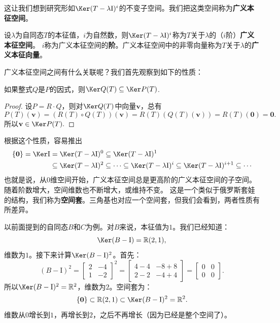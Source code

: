 \documentclass[12pt,UTF8]{ctexbook}
\begin{document}
这让我们想到研究形如$\Ker (T - \lambda\mathrm{I})^i$的不变子空间。我们把这类空间称为\textbf{广义本征空间}。

\begin{df}\label{df:6_4}
    设$\lambda$为自同态$T$的本征值，$i$为自然数，则$\Ker (T - \lambda\mathrm{I})^i$称为$T$关于$\lambda$的（$i$阶）\textbf{广义本征空间}。
    $i$称为广义本征空间的\textbf{阶}。广义本征空间中的非零向量称为$T$关于$\lambda$的\textbf{广义本征向量}。
\end{df}

广义本征空间之间有什么关联呢？我们首先观察到如下的性质：
\begin{pp}\label{pp:6_12_1}
    如果整式$Q$是$P$的因式，则$\Ker Q(T) \subseteq \Ker P(T)$.
\end{pp}
\begin{proof} %
    设$P = R \cdot Q$，则对$\Ker Q(T)$中向量$\mathbf{v}$，总有
    $$P(T)(\mathbf{v}) = (R(T)\circ Q(T))(\mathbf{v}) = R(T)(Q(T)(\mathbf{v})) = R(T)(\mathbf{0}) = \mathbf{0}. $$
    所以$\mathbf{v} \in \Ker P(T).$

\end{proof}

根据这个性质，容易推出
\begin{align*}
    \{\mathbf{0}\} = \Ker \mathrm{I} &= \Ker (T - \lambda\mathrm{I})^0 \subseteq \Ker (T - \lambda\mathrm{I})^1  \\
    &\subseteq \Ker (T - \lambda\mathrm{I})^2 \subseteq \cdots \subseteq \Ker (T - \lambda\mathrm{I})^i \subseteq \Ker (T - \lambda\mathrm{I})^{i+1} \subseteq \cdots 
\end{align*}
也就是说，从0维空间开始，广义本征空间总是更高阶的广义本征空间的子空间。随着阶数增大，空间维数也不断增大，或维持不变。
这是一个类似于俄罗斯套娃的结构，我们称为\textbf{空间套}。三角基也对应一个空间套，但我们会看到，两者性质有所差异。

以前面提到的自同态$B$和$C$为例。对$B$来说，本征值为$1$。我们已经知道：
$$
\Ker(B - \mathrm{I}) = \mathbb{R}(2,1),
$$
维数为$1$。接下来计算$\Ker(B - \mathrm{I})^2$。首先：
$$
(B - \mathrm{I})^2 = \begin{bmatrix} 2 & -4 \\ 1 & -2 \end{bmatrix}^2 = \begin{bmatrix} 4-4 & -8+8 \\ 2-2 & -4+4 \end{bmatrix} = \begin{bmatrix} 0 & 0 \\ 0 & 0 \end{bmatrix}.
$$
所以$\Ker(B - \mathrm{I})^2 = \mathbb{R}^2$，维数为$2$。空间套为：
$$
\{\mathbf{0}\} \subset \mathbb{R}(2,1) \subset \Ker(B - \mathrm{I})^2 = \mathbb{R}^2.
$$
维数从$0$增长到$1$，再增长到$2$，之后不再增长（因为已经是整个空间了）。
\end{document}

